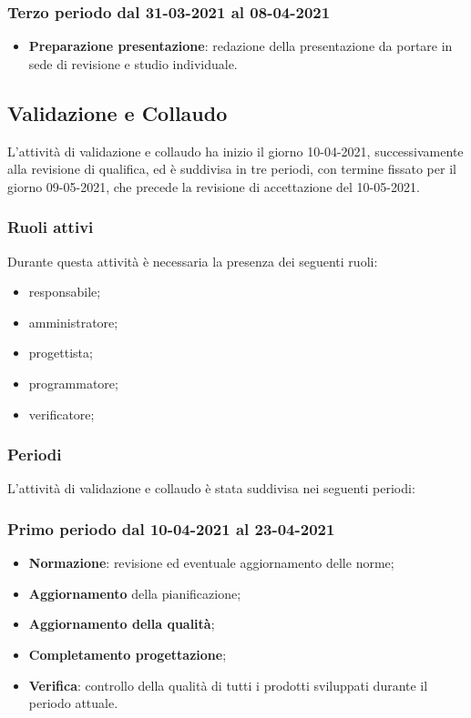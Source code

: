 	\subsubsection{Terzo periodo dal 31-03-2021 al 08-04-2021}
	\begin{itemize}
	\item \textbf{Preparazione presentazione}: redazione della presentazione da portare in sede di revisione e
	studio individuale.
	\end{itemize}

	\newpage
	
	\newpage
	
	\newpage

	\subsection{Validazione e Collaudo}
	L’attività di validazione e collaudo ha inizio il giorno 10-04-2021, successivamente alla revisione di
	qualifica, ed è suddivisa in tre periodi, con termine fissato per il giorno 09-05-2021, che precede la
	revisione di accettazione del 10-05-2021.
	
	\subsubsection{Ruoli attivi}
	Durante questa attività è necessaria la presenza dei seguenti ruoli:
	\begin{itemize}
		\item responsabile;
		\item amministratore;
		\item progettista;
		\item programmatore;
		\item verificatore;
	\end{itemize}

	\subsubsection{Periodi}
	L’attività di validazione e collaudo è stata suddivisa nei seguenti periodi:
	\subsubsection{Primo periodo dal 10-04-2021 al 23-04-2021}
	\begin{itemize}
		\item \textbf{Normazione}: revisione ed eventuale aggiornamento delle norme;
		\item \textbf{Aggiornamento} della pianificazione;
		\item \textbf{Aggiornamento della qualità};
		\item \textbf{Completamento progettazione};
		\item \textbf{Verifica}: controllo della qualità di tutti i prodotti sviluppati durante il periodo attuale.
	\end{itemize}

